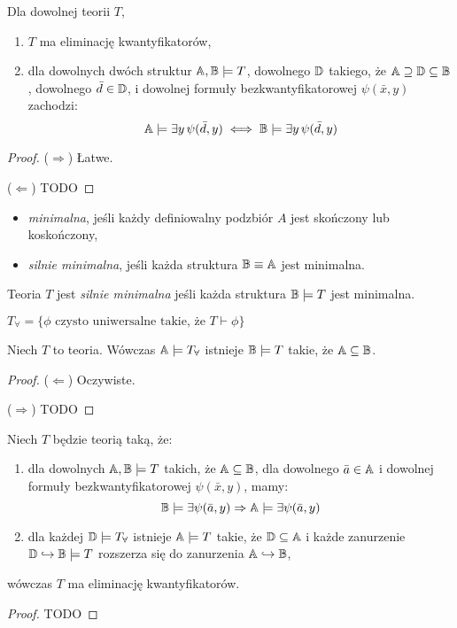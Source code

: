 \documentclass{article}
\begin{document}
\begin{tw}
Dla dowolnej teorii $T$, \fae
	\begin{enumerate}
		\item $T$ ma eliminację kwantyfikatorów,
		\item dla dowolnych dwóch struktur $\mathbb{A}, \mathbb{B} \models T$, dowolnego $\mathbb{D}$ takiego, że $\mathbb{A} \supseteq \mathbb{D} \subseteq \mathbb{B}$,  dowolnego $\bar{d} \in \mathbb{D}$, i dowolnej formuły bezkwantyfikatorowej $\psi(\bar{x}, y)$  zachodzi:
			\[\mathbb{A} \models \exists y \, \psi(\bar{d}, y) \iff \mathbb{B} \models \exists y \, \psi(\bar{d}, y)\]
	\end{enumerate}
\end{tw}
\begin{proof}
	($\Rightarrow$) Łatwe.

	($\Leftarrow$) \color{red} TODO
\end{proof}

\begin{df}
	\begin{itemize}
		Struktura $\A$ jest:
		\item \textit{minimalna}, jeśli każdy definiowalny podzbiór $A$ jest skończony lub koskończony,
		\item \textit{silnie minimalna}, jeśli każda struktura $\mathbb{B} \equiv \mathbb{A}$ jest minimalna.
	\end{itemize}

	Teoria $T$ jest \textit{silnie minimalna} jeśli każda struktura $\mathbb{B} \models T$ jest minimalna.
\end{df}


\begin{df}
	$T_{\forall} = \{\phi \text{ czysto uniwersalne takie, że } T \vdash
	\phi\}$
\end{df}

\begin{stw}
	Niech $T$ to teoria.
	Wówczas $\mathbb{A} \models T_{\forall}$ \wtw istnieje $\mathbb{B} \models T$ takie, że $\mathbb{A} \subseteq \mathbb{B}$.
\end{stw}
\begin{proof}
	($\Leftarrow$) Oczywiste.

		($\Rightarrow$) \color{red} TODO
\end{proof}

\begin{tw}
	\label{qe}
	Niech $T$ będzie teorią taką, że:
	\begin{enumerate}
		\item dla dowolnych $\mathbb{A}, \mathbb{B} \models T$ takich, że $\mathbb{A} \subseteq \mathbb{B}$, dla dowolnego $\bar{a} \in \mathbb{A}$ i dowolnej formuły bezkwantyfikatorowej $\psi(\bar{x}, y)$, mamy:
			\[
				\mathbb{B} \models \exists \psi(\bar{a}, y) \Rightarrow \mathbb{A} \models \exists \psi(\bar{a}, y)
			\]
		\item dla każdej $\mathbb{D} \models T_{\forall}$ istnieje $\mathbb{A} \models T$ takie, że $\mathbb{D} \subseteq \mathbb{A}$ i każde zanurzenie $\mathbb{D} \hookrightarrow \mathbb{B} \models T$ rozszerza się do zanurzenia $\mathbb{A} \hookrightarrow \mathbb{B}$,
	\end{enumerate}
	wówczas $T$ ma eliminację kwantyfikatorów.
\end{tw}
\begin{proof}
	\color{red} TODO
\end{proof}
\end{document}
